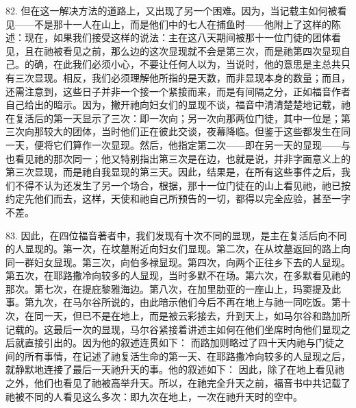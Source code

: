 82. 但在这一解决方法的道路上，又出现了另一个困难。因为，当记载主如何被看见——不是那十一人在山上，而是他们中的七人在捕鱼时——他附上了这样的陈述：现在，如果我们接受这样的说法：主在这八天期间被那十一位门徒的团体看见，且在祂被看见之前，那么边的这次显现就不会是第三次，而是祂第四次显现自己。的确，在此我们必须小心，不要让任何人以为，当说时，他的意思是主总共只有三次显现。相反，我们必须理解他所指的是天数，而非显现本身的数量；而且，还需注意到，这些日子并非一个接一个紧接而来，而是有间隔之分，正如福音作者自己给出的暗示。因为，撇开祂向妇女们的显现不谈，福音中清清楚楚地记载，祂在复活后的第一天显示了三次：即一次向；另一次向那两位门徒，其中一位是；第三次向那较大的团体，当时他们正在彼此交谈，夜幕降临。但鉴于这些都发生在同一天，便将它们算作一次显现。然后，他指定第二次——即在另一天的显现——与也看见祂的那次同一；他又特别指出第三次是在边，也就是说，并非字面意义上的第三次显现，而是祂自我显现的第三天。因此，结果是，在所有这些事件之后，我们不得不认为还发生了另一个场合，根据，那十一位门徒在的山上看见祂，祂已按约定先他们而去，这样，天使和祂自己所预告的一切，都得以完全应验，甚至一字不差。\par

83. 因此，在四位福音著者中，我们发现有十次不同的显现，是主在复活后向不同的人显现的。第一次，在坟墓附近向妇女们显现。第二次，在从坟墓返回的路上向同一群妇女显现。第三次，向伯多禄显现。第四次，向两个正往乡下去的人显现。第五次，在耶路撒冷向较多的人显现，当时多默不在场。第六次，在多默看见祂的那次。第七次，在提庇黎雅海边。第八次，在加里肋亚的一座山上，玛窦提及此事。第九次，在马尔谷所说的，由此暗示他们今后不再在地上与祂一同吃饭。第十次，在同一天，但已不是在地上，而是被云彩接去，升到天上，如马尔谷和路加所记载的。这最后一次的显现，马尔谷紧接着讲述主如何在他们坐席时向他们显现之后就直接引出的。因为他的叙述连贯如下： 而路加则略过了四十天内祂与门徒之间的所有事情，在记述了祂复活生命的第一天、在耶路撒冷向较多的人显现之后，就静默地连接了最后一天祂升天的事。他的叙述如下： 因此，除了在地上看见祂之外，他们也看见了祂被高举升天。所以，在祂完全升天之前，福音书中共记载了祂被不同的人看见这么多次：即九次在地上，一次在祂升天时的空中。\par

